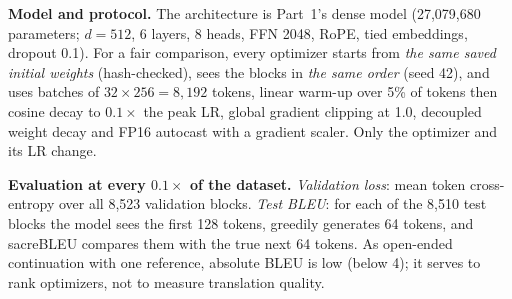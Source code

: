 \documentclass[11pt,a4paper]{article}
\begin{document}
\textbf{Model and protocol.} The architecture is Part~1's dense model (27,079,680 parameters; $d=512$, 6 layers, 8 heads, FFN 2048, RoPE, tied embeddings, dropout 0.1). For a fair comparison, every optimizer starts from \emph{the same saved initial weights} (hash-checked), sees the blocks in \emph{the same order} (seed 42), and uses batches of $32\times256=8{,}192$ tokens, linear warm-up over 5\% of tokens then cosine decay to $0.1\times$ the peak LR, global gradient clipping at 1.0, decoupled weight decay and FP16 autocast with a gradient scaler. Only the optimizer and its LR change.

\textbf{Evaluation at every $0.1\times$ of the dataset.} \emph{Validation loss}: mean token cross-entropy over all 8,523 validation blocks. \emph{Test BLEU}: for each of the 8,510 test blocks the model sees the first 128 tokens, greedily generates 64 tokens, and sacreBLEU compares them with the true next 64 tokens. As open-ended continuation with one reference, absolute BLEU is low (below 4); it serves to rank optimizers, not to measure translation quality.
\end{document}
